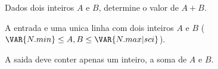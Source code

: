 Dados dois inteiros $A$ e $B$, determine o valor de $A + B$.

A entrada e uma unica linha com dois inteiros $A$ e $B$
($\VAR{N.min} \leq A, B \leq \VAR{N.max | sci}$).

A saida deve conter apenas um inteiro, a soma de $A$ e $B$.
